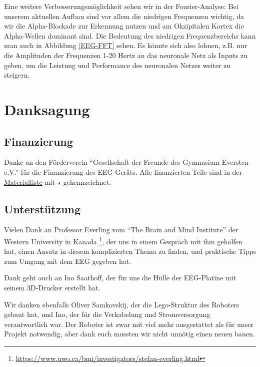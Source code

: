 \documentclass[11pt]{scrartcl}
\begin{document}
%
%
	
Eine weitere Verbesserungsmöglichkeit sehen wir in der Fourier-Analyse:
Bei unserem aktuellen Aufbau sind vor allem die niedrigen Frequenzen wichtig, da wir die Alpha-Blockade zur Erkennung nutzen und am Okzipitalen Kortex die Alpha-Wellen dominant sind. Die Bedeutung des niedrigen Frequenzbereichs kann man auch in Abbildung \ref{EEG-FFT} sehen. Es könnte sich also lohnen, z.B. nur die Amplituden der Frequenzen 1-20 Hertz an das neuronale Netz als Inputs zu geben, um die Leistung und Performance des neuronalen Netzes weiter zu steigern. 

	\newpage

	\section{Danksagung}

	\subsection{Finanzierung} \label{Foerderverein}

	Danke an den Förderverein \enquote{Gesellschaft der Freunde des Gymnasium Eversten e.V.} für die Finanzierung des EEG-Geräts. Alle finanzierten Teile sind in der \hyperref[Materialien]{Materialliste} mit $\star$ gekennzeichnet. 

	\subsection{Unterstützung} \label{Unterstuetzung}

	Vielen Dank an Professor Everling vom \enquote{The Brain and Mind Institute} der Western University in Kanada \footnote{\url{https://www.uwo.ca/bmi/investigators/stefan-everling.html}}, der uns in einem Gespräch mit ihm geholfen hat, einen Ansatz in diesem komplizierten Thema zu finden, und praktische Tipps zum Umgang mit dem EEG gegeben hat.

	Dank geht auch an Ino Saathoff, der für uns die Hülle der EEG-Platine mit seinem 3D-Drucker erstellt hat.

	Wir danken ebenfalls Oliver Samkovskij, der die Lego-Struktur des Roboters gebaut hat, und Ino, der für die Verkabelung und Stromversorgung verantwortlich war. Der Roboter ist zwar mit viel mehr ausgestattet als für unser Projekt notwendig, aber dank euch mussten wir nicht unnötig einen neuen bauen.
\end{document}
